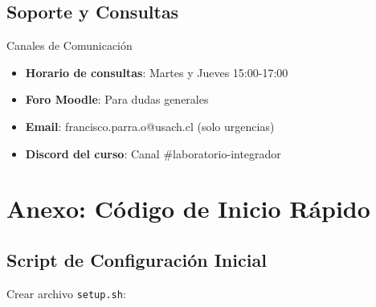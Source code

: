 \documentclass[12pt,a4paper]{article}
\begin{document}
\subsection{Soporte y Consultas}

\begin{taskbox}{Canales de Comunicación}
\begin{itemize}
    \item \textbf{Horario de consultas}: Martes y Jueves 15:00-17:00
    \item \textbf{Foro Moodle}: Para dudas generales
    \item \textbf{Email}: francisco.parra.o@usach.cl (solo urgencias)
    \item \textbf{Discord del curso}: Canal \#laboratorio-integrador
\end{itemize}
\end{taskbox}

\section{Anexo: Código de Inicio Rápido}

\subsection{Script de Configuración Inicial}

Crear archivo \texttt{setup.sh}:
\end{document}
